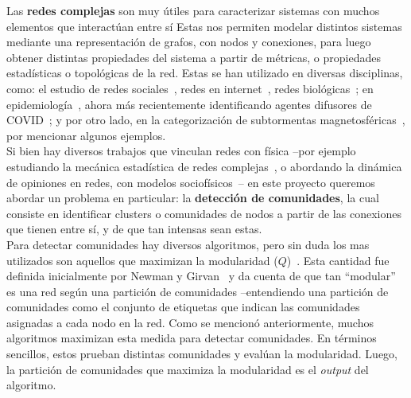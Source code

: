 \documentclass{proyectotesis}
\begin{document}
Las \textbf{redes complejas} son muy útiles para caracterizar sistemas con muchos elementos que interactúan entre sí Estas nos permiten modelar distintos sistemas mediante una representación de grafos, con nodos y conexiones, para luego obtener distintas propiedades del sistema a partir de métricas, o propiedades estadísticas o topológicas de la red. Estas se han utilizado en diversas disciplinas, como: el estudio de redes sociales~\cite{newman_structure_2003, cantwell_friendship_2021}, redes en internet~\cite{newman_structure_2003}, redes biológicas~\cite{newman_structure_2003, da_fontoura_costa_complex_2008}; en epidemiología~\cite{karrer_competing_2011}, ahora más recientemente identificando agentes difusores de COVID~\cite{montes-orozco_identification_2020}; y por otro lado, en la categorización de subtormentas magnetosféricas~\cite{dods_network_2015}, por mencionar algunos ejemplos.\\

Si bien hay diversos trabajos que vinculan redes con física --por ejemplo estudiando la mecánica estadística de redes complejas~\cite{albert_statistical_2001, pastor-satorras_statistical_2003}, o abordando la dinámica de opiniones en redes, con modelos sociofísicos~\cite{suchecki_conservation_2005, castellano_statistical_2009}-- en este proyecto queremos abordar un problema en particular: la \textbf{detección de comunidades}, la cual consiste en identificar clusters o comunidades de nodos a partir de las conexiones que tienen entre sí, y de que tan intensas sean estas.\\


Para detectar comunidades hay diversos algoritmos, pero sin duda los mas utilizados son aquellos que maximizan la modularidad ($Q$)~\cite{newman_fast_2004, clauset_finding_2004, duch_community_2005, blondel_fast_2008, arab_modularity_2012, chen_community_2014}. Esta cantidad fue definida inicialmente por Newman y Girvan~\cite{newman_finding_2004} y da cuenta de que tan ``modular'' es una red según una partición de comunidades --entendiendo una partición de comunidades como el conjunto de etiquetas que indican las comunidades asignadas a cada nodo en la red. Como se mencionó anteriormente, muchos algoritmos maximizan esta medida para detectar comunidades. En términos sencillos, estos prueban distintas comunidades y evalúan la modularidad. Luego, la partición de comunidades que maximiza la modularidad es el \textit{output} del algoritmo.\\
\end{document}
